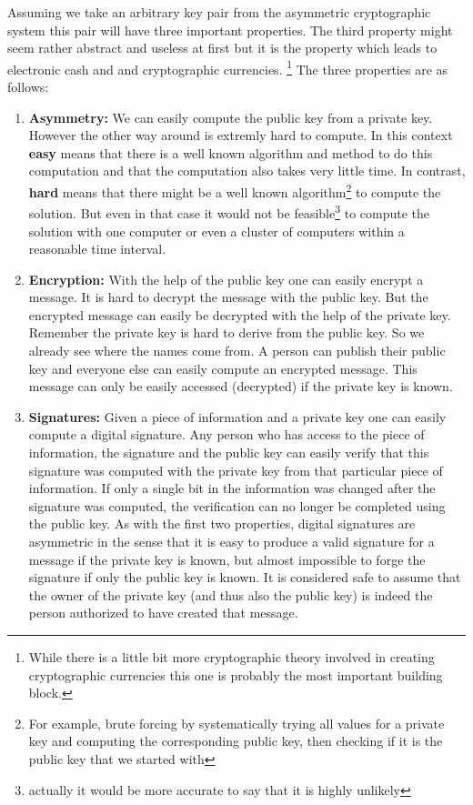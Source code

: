 \documentclass[a4paper,12pt,oneside,openany]{book}
\begin{document}
Assuming we take an arbitrary key pair from the asymmetric cryptographic
system this pair will have three important properties.  The third
property might seem rather abstract and useless at first but it is the
property which leads to electronic cash and and cryptographic
currencies. \footnote{While there is a little bit more cryptographic
  theory involved in creating cryptographic currencies this one is
  probably the most important building block.}  The three properties are
as follows:
\begin{enumerate}
\item \textbf{Asymmetry:} We can easily compute the public key from a
  private key.  However the other way around is extremly hard to
  compute.  In this context \textbf{\gls{easy}} means that there is a
  well known algorithm and method to do this computation and that the
  computation also takes very little time.  In contrast,
  \textbf{\gls{hard}} means that there might be a well known
  algorithm\footnote{For example, brute forcing by systematically trying
    all values for a private key and computing the corresponding public
    key, then checking if it is the public key that we started with} to
  compute the solution.  But even in that case it would not be
  feasible\footnote{actually it would be more accurate to say that it is
    highly unlikely} to compute the solution with one computer or even a
  cluster of computers within a reasonable time interval.
\item \textbf{Encryption:} With the help of the public key one can
  easily encrypt a message.  It is hard to decrypt the message with the
  public key.  But the encrypted message can easily be decrypted with
  the help of the private key.  Remember the private key is hard to
  derive from the public key.  So we already see where the names come
  from.  A person can publish their public key and everyone else can
  easily compute an encrypted message.  This message can only be easily
  accessed (decrypted) if the private key is known.
\item \textbf{Signatures:} Given a piece of information and a private
  key one can easily compute a digital signature.  Any person who has
  access to the piece of information, the signature and the public key
  can easily verify that this signature was computed with the private
  key from that particular piece of information.  If only a single bit
  in the information was changed after the signature was computed, the
  verification can no longer be completed using the public key.  As with
  the first two properties, digital signatures are asymmetric in the
  sense that it is easy to produce a valid signature for a message if
  the private key is known, but almost impossible to forge the signature
  if only the public key is known.  It is considered safe to assume that
  the owner of the private key (and thus also the public key) is indeed
  the person authorized to have created that message.
\end{enumerate}
\end{document}
